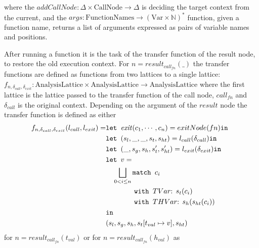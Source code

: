 where the $\mathit{addCallNode} : \Delta \times \text{CallNode} \rightarrow \Delta$ is deciding the target context from the current, and the $args : \text{FunctionNames} \rightarrow (\text{Var} \times \mathbb{N})^*$ function, given a function name, returns a list of arguments expressed as pairs of variable names and positions.

After running a function it is the task of the transfer function of the result node, to restore the old execution context.  For $n = \mathit{result}_{\mathit{call}_{fn}}(\_)$ the transfer functions are defined as functions from two lattices to a single lattice: $f_{n,\delta_{call},\delta_{exit}}: \text{AnalysisLattice} \times \text{AnalysisLattice} \rightarrow \text{AnalysisLattice}$ where the first lattice is the lattice passed to the transfer function of the call node, ${\mathit{call}_{fn}}$ and $\delta_{call}$ is the original context. Depending on the argument of the $\mathit{result}$ node the transfer function is defined as either
\begin{align}
f_{n,\delta_{call}, \delta_{exit}}(l_{call}, l_{exit})=   &\texttt{let } \mathit{exit}(c_1, \cdots, c_n) = exitNode(fn) \texttt{in }\notag\\
                                                &\texttt{let } (s_l, \_, \_, s_t, s_{ht}) = l_{call}(\delta_{call}) \texttt{in }\notag\\
                                                &\texttt{let } (\_, s_g, s_h, s_t', s_{ht}') = l_{exit}(\delta_{exit}) \texttt{in }\notag\\
                                                &\texttt{let } v = \notag\\
                                                &\quad \bigsqcup_{0<i \leq n} \texttt{match }c_i\notag\\
                                                &\quad\quad\quad\quad \texttt{with }TVar\text{: } s_t(c_i)\notag\\
                                                &\quad\quad\quad\quad \texttt{with }THVar\text{: } s_h(s_{ht}(c_i))\notag\\
                                                & \texttt{in }\notag\\
                                                &(s_l,s_g,s_h, s_t[t_{val}\mapsto v], s_{ht})
\end{align}
for $n = \mathit{result}_{\mathit{call}_{fn}}(t_{val})$ or for $n = \mathit{result}_{\mathit{call}_{fn}}(h_{val})$ as 
